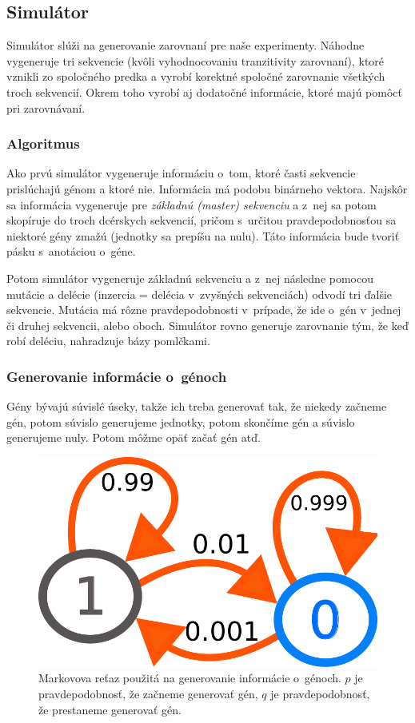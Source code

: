 \subsection{Simulátor}
\label{subsec:simulator}

Simulátor slúži na generovanie zarovnaní pre naše experimenty. Náhodne vygeneruje tri sekvencie (kvôli vyhodnocovaniu tranzitivity zarovnaní), ktoré vznikli zo spoločného predka a vyrobí korektné spoločné zarovnanie všetkých troch sekvencií. Okrem toho vyrobí aj dodatočné informácie, ktoré majú pomôcť pri zarovnávaní.

\subsubsection{Algoritmus}
Ako prvú simulátor vygeneruje informáciu o~tom, ktoré časti sekvencie prislúchajú génom a ktoré nie. Informácia má podobu binárneho vektora.
Najskôr sa informácia vygeneruje pre \textit{základnú (master) sekvenciu} a z~nej sa potom skopíruje do troch dcérskych sekvencií, pričom s~určitou pravdepodobnosťou sa niektoré gény zmažú (jednotky sa prepíšu na nulu). Táto informácia bude tvoriť pásku s~anotáciou o~géne.

Potom simulátor vygeneruje základnú sekvenciu a z~nej následne pomocou mutácie a delécie (inzercia = delécia v~zvyšných sekvenciách) odvodí tri ďalšie sekvencie. Mutácia má rôzne pravdepodobnosti v~prípade, že ide o~gén v~jednej či druhej sekvencii, alebo oboch.
Simulátor rovno generuje zarovnanie tým, že keď robí deléciu, nahradzuje bázy pomlčkami.


\subsubsection{Generovanie informácie o~génoch}
Gény bývajú súvislé úseky, takže ich treba generovať tak, že niekedy začneme gén, potom súvislo generujeme jednotky, potom skončíme gén a súvislo generujeme nuly. Potom môžme opäť začať gén atď.

\begin{figure}[htp]
    \centering
    \includegraphics[width=.7\textwidth]{images/markov_chain}
    \caption[Markovova reťaz použitá na generovanie informácie o~génoch]{Markovova reťaz použitá na generovanie informácie o~génoch. $p$ je pravdepodobnosť, že začneme generovať gén, $q$ je pravdepodobnosť, že prestaneme generovať gén.}
    \label{fig:markov-chain}
\end{figure}

